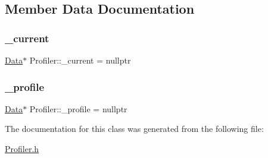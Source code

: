 \subsection{Member Data Documentation}
\mbox{\label{class_profiler_a2d8b680e39756a8451e49ae51696d010}} 
\subsubsection{\texorpdfstring{\+\_\+current}{\_current}}
{\footnotesize\ttfamily \hyperlink{struct_profiler_1_1_data}{Data}$\ast$ Profiler\+::\+\_\+current = nullptr\hspace{0.3cm}{\ttfamily [private]}}

\mbox{\label{class_profiler_a862fb21ca07c94f5f657c7cd1a053a33}} 
\subsubsection{\texorpdfstring{\+\_\+profile}{\_profile}}
{\footnotesize\ttfamily \hyperlink{struct_profiler_1_1_data}{Data}$\ast$ Profiler\+::\+\_\+profile = nullptr\hspace{0.3cm}{\ttfamily [private]}}



The documentation for this class was generated from the following file\+:\begin{DoxyCompactItemize}
\item 
\hyperlink{_profiler_8h}{Profiler.\+h}\end{DoxyCompactItemize}
